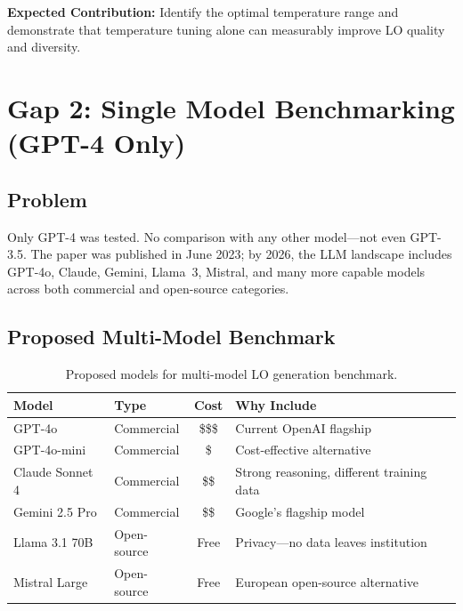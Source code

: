 \documentclass[11pt,a4paper]{article}
\begin{document}
\begin{notebox}
\textbf{Expected Contribution:} Identify the optimal temperature range and demonstrate that temperature tuning alone can measurably improve LO quality and diversity.
\end{notebox}

\section{Gap 2: Single Model Benchmarking (GPT-4 Only)}

\subsection{Problem}
Only GPT-4 was tested. No comparison with any other model---not even GPT-3.5. The paper was published in June 2023; by 2026, the LLM landscape includes GPT-4o, Claude, Gemini, Llama~3, Mistral, and many more capable models across both commercial and open-source categories.

\subsection{Proposed Multi-Model Benchmark}

\begin{table}[H]
\centering
\caption{Proposed models for multi-model LO generation benchmark.}
\label{tab:models}
\begin{tabular}{@{}llcp{5cm}@{}}
\toprule
\textbf{Model} & \textbf{Type} & \textbf{Cost} & \textbf{Why Include} \\
\midrule
GPT-4o & Commercial & \$\$\$ & Current OpenAI flagship \\
GPT-4o-mini & Commercial & \$ & Cost-effective alternative \\
Claude Sonnet 4 & Commercial & \$\$ & Strong reasoning, different training data \\
Gemini 2.5 Pro & Commercial & \$\$ & Google's flagship model \\
Llama 3.1 70B & Open-source & Free & Privacy---no data leaves institution \\
Mistral Large & Open-source & Free & European open-source alternative \\
\bottomrule
\end{tabular}
\end{table}
\end{document}
